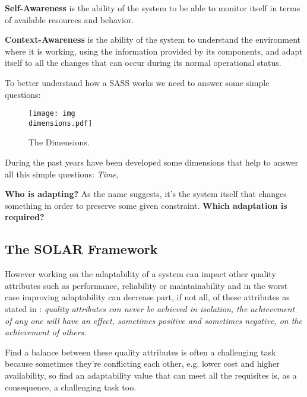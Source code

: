 \textbf{Self-Awareness} is the ability of the system to be able to monitor itself in terms of available resources and behavior.

\textbf{Context-Awareness} is the ability of the system to understand the environment where it is working, using the information provided by its components, and adapt itself to all the changes that can occur during its normal operational status.

To better understand how a SASS works we need to answer some simple questions:\linebreak
\iffalse
\begin{itemize}
	\item Who is adapting?
	\item Which adaptation is required?
	\item When is necessary to adapt?
	\item Where is needed to change something
	\item Why is needed an adaptation?
	\item How we achieve this goal?
\end{itemize}
\fi
\begin{figure}[t]
	\centerline
	{\texttt{[image: img\\dimensions.pdf]}}
	\caption[The Dimensions]{The Dimensions.}
	\label{fig:dimensions}
\end{figure}
During the past years have been developed some dimensions that help to answer all this simple questions: \emph{Time}, 

\textbf{Who is adapting?} As the name suggests, it's the system itself that changes something in order to preserve some given constraint.
\textbf{Which adaptation is required?} 
\subsection{The SOLAR Framework}
However working on the adaptability of a system can impact other quality attributes such as performance, reliability or maintainability and in the worst case improving adaptability can decrease part, if not all, of these attributes as stated in \cite{bass2003software}: \emph{quality attributes can never be achieved in isolation, the achievement of any one will have an effect, sometimes positive and sometimes negative, on the achievement of others}.

Find a balance between these quality attributes is often a challenging task because sometimes they're conflicting each other, e.g. lower cost and higher availability, so find an adaptability value that can meet all the requisites is, as a consequence, a challenging task too.




